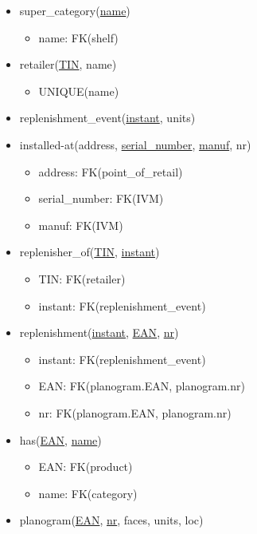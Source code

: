 \documentclass[12pt,a4paper]{report}
\begin{document}
\begin{itemize}
\item super\_category(\underline{name})
  \begin{itemize}
  \item name: FK(shelf)
  \end{itemize}

\item retailer(\underline{TIN}, name)
  \begin{itemize}
  \item UNIQUE(name)
  \end{itemize}
  
\item replenishment\_event(\underline{instant}, units)
  
\item installed-at(address, \underline{serial\_number}, \underline{manuf}, nr)
  \begin{itemize}
  \item address: FK(point\_of\_retail)
  \item serial\_number: FK(IVM)
  \item manuf: FK(IVM)
    \end{itemize}

\item replenisher\_of(\underline{TIN}, \underline{instant})
  \begin{itemize}
  \item TIN: FK(retailer)
  \item instant: FK(replenishment\_event)
  \end{itemize}
  
\item replenishment(\underline{instant}, \underline{EAN}, \underline{nr})
  \begin{itemize}
  \item instant: FK(replenishment\_event)
  \item EAN: FK(planogram.EAN, planogram.nr)
  \item nr: FK(planogram.EAN, planogram.nr)
  \end{itemize}
  
\item has(\underline{EAN}, \underline{name})
  \begin{itemize}
  \item EAN: FK(product)
  \item name: FK(category)
    \end{itemize}


\item planogram(\underline{EAN}, \underline{nr}, faces, units, loc)


\end{itemize}
\end{document}
